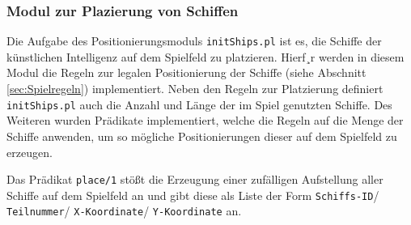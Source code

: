 \subsubsection{Modul zur Plazierung von Schiffen} \label{sec:initships}	
	Die Aufgabe des Positionierungsmoduls \texttt{initShips.pl} ist es, die Schiffe der künstlichen Intelligenz auf dem Spielfeld zu platzieren.
	Hierf¸r werden in diesem Modul die Regeln zur legalen Positionierung der Schiffe (siehe Abschnitt \ref{sec:Spielregeln}) implementiert. Neben den Regeln 
	zur Platzierung definiert \texttt{initShips.pl} auch die Anzahl und Länge der im Spiel genutzten Schiffe. Des Weiteren wurden Prädikate implementiert, 
	welche die Regeln auf die Menge der Schiffe anwenden, um so mögliche Positionierungen dieser auf dem Spielfeld zu erzeugen.
	
	Das Prädikat \texttt{place/1} stößt die Erzeugung einer zufälligen Aufstellung aller Schiffe auf dem Spielfeld an und gibt diese als Liste der Form 
	\texttt{Schiffs-ID}/ \texttt{Teilnummer}/ \texttt{X-Koordinate}/ \texttt{Y-Koordinate} an.
	
